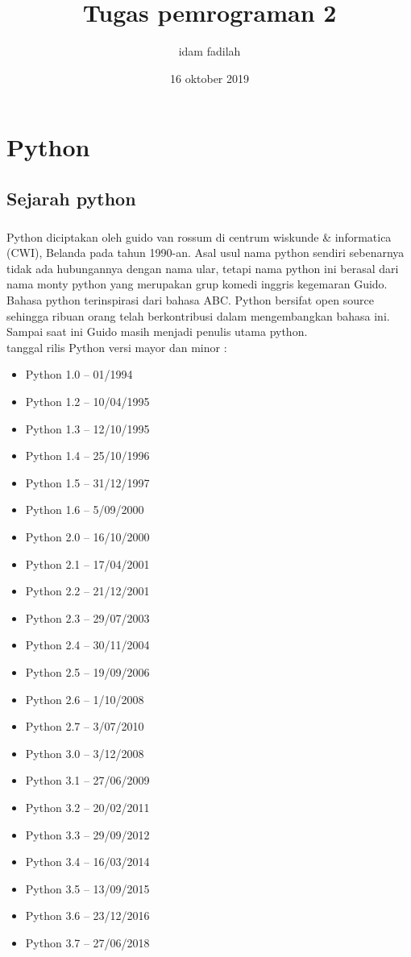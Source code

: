 \documentclass[a4paper,12pt]{report}
\title{Tugas pemrograman 2}
\author{idam fadilah}
\date{16 oktober 2019}
\begin{document}
\maketitle

\chapter{Python}
\section{Sejarah python}
\paragraph{}
Python diciptakan oleh guido van rossum di centrum wiskunde \& informatica (CWI), Belanda pada tahun 1990-an. Asal usul nama python sendiri sebenarnya tidak ada hubungannya dengan nama ular, tetapi nama python ini berasal dari nama monty python yang merupakan grup komedi inggris kegemaran Guido. Bahasa python terinspirasi dari bahasa ABC. Python bersifat open source sehingga ribuan orang telah berkontribusi dalam mengembangkan bahasa ini. Sampai saat ini Guido masih menjadi penulis utama python.\\
tanggal rilis Python versi mayor dan minor :
\begin{itemize}
	\item Python 1.0 – 01/1994
	\item Python 1.2 – 10/04/1995
	\item Python 1.3 – 12/10/1995
	\item Python 1.4 – 25/10/1996
	\item Python 1.5 – 31/12/1997
	\item Python 1.6 – 5/09/2000
	\item Python 2.0 – 16/10/2000
	\item Python 2.1 – 17/04/2001
	\item Python 2.2 – 21/12/2001
	\item Python 2.3 – 29/07/2003
	\item Python 2.4 – 30/11/2004
	\item Python 2.5 – 19/09/2006
	\item Python 2.6 – 1/10/2008
	\item Python 2.7 – 3/07/2010
	\item Python 3.0 – 3/12/2008
	\item Python 3.1 – 27/06/2009
	\item Python 3.2 – 20/02/2011
	\item Python 3.3 – 29/09/2012
	\item Python 3.4 – 16/03/2014
	\item Python 3.5 – 13/09/2015
	\item Python 3.6 – 23/12/2016
	\item Python 3.7 – 27/06/2018
	
	
\end{itemize}
\end{document}
